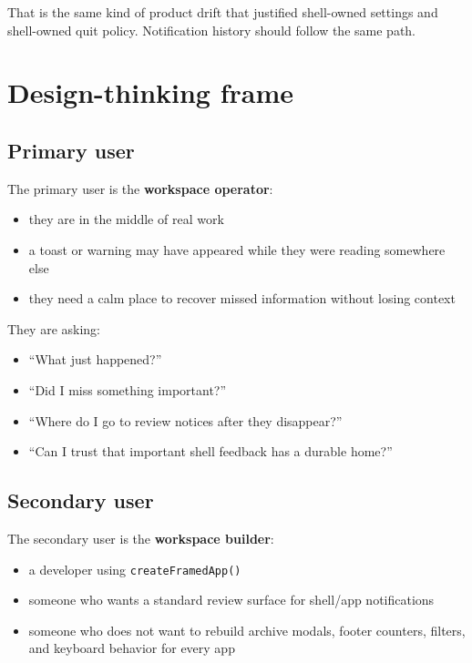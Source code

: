That is the same kind of product drift that justified shell-owned settings and shell-owned quit policy. Notification history should follow the same path.

\section{Design-thinking frame}\label{record-053-design-thinking-frame}

\subsection{Primary user}\label{record-053-primary-user}

The primary user is the \textbf{workspace operator}:

\begin{itemize}
\tightlist
\item
  they are in the middle of real work
\item
  a toast or warning may have appeared while they were reading somewhere else
\item
  they need a calm place to recover missed information without losing context
\end{itemize}

They are asking:

\begin{itemize}
\tightlist
\item
  ``What just happened?''
\item
  ``Did I miss something important?''
\item
  ``Where do I go to review notices after they disappear?''
\item
  ``Can I trust that important shell feedback has a durable home?''
\end{itemize}

\subsection{Secondary user}\label{record-053-secondary-user}

The secondary user is the \textbf{workspace builder}:

\begin{itemize}
\tightlist
\item
  a developer using \texttt{c\allowbreak{}r\allowbreak{}e\allowbreak{}a\allowbreak{}t\allowbreak{}e\allowbreak{}F\allowbreak{}r\allowbreak{}a\allowbreak{}m\allowbreak{}e\allowbreak{}d\allowbreak{}A\allowbreak{}p\allowbreak{}p\allowbreak{}(\allowbreak{})}
\item
  someone who wants a standard review surface for shell/app notifications
\item
  someone who does not want to rebuild archive modals, footer counters, filters, and keyboard behavior for every app
\end{itemize}

